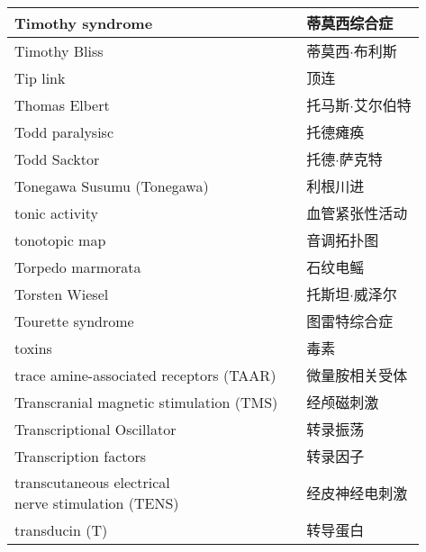 \begin{longtable}{lll}
	\midrule
	Timothy syndrome  && 蒂莫西综合症  \\
	
	\midrule
	Timothy Bliss  && 蒂莫西$\cdot$布利斯  \\
	
	\midrule
	Tip link  && 顶连  \\
	
	\midrule
	Thomas Elbert   && 托马斯$\cdot$艾尔伯特  \\
	
	\midrule
	Todd paralysisc   && 托德瘫痪  \\
	
	\midrule
	Todd Sacktor   && 托德$\cdot$萨克特  \\
	
	\midrule
	Tonegawa Susumu (Tonegawa)   && 利根川进  \\
	
	\midrule
	tonic activity   && 血管紧张性活动  \\
	
	\midrule
	tonotopic map   && 音调拓扑图  \\
	
	\midrule
	Torpedo marmorata   && 石纹电鳐  \\
	
	\midrule
	Torsten Wiesel   && 托斯坦$\cdot$威泽尔  \\
	
	\midrule
	Tourette syndrome   && 图雷特综合症  \\
	
	\midrule
	toxins   && 毒素  \\
	
	\midrule
	trace amine-associated receptors (TAAR)   && 微量胺相关受体  \\
	
	\midrule
	Transcranial magnetic stimulation (TMS)   && 经颅磁刺激  \\
	
	\midrule
	Transcriptional Oscillator   && 转录振荡  \\
	
	\midrule
	Transcription factors   && 转录因子  \\
	
	\midrule
	\makecell[l]{transcutaneous electrical \\nerve stimulation (TENS)}   && 经皮神经电刺激  \\
	
	\midrule
	transducin (T)   && 转导蛋白  \\
	

\end{longtable}
